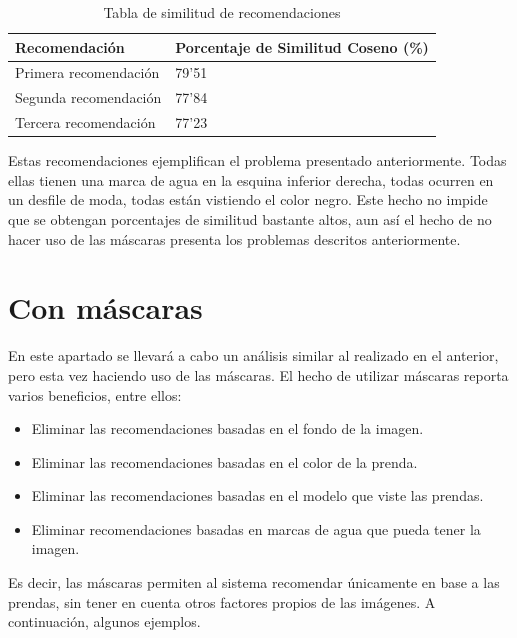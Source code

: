 \documentclass[12pt]{report} %
\begin{document}
	\begin{table}[H]
		\centering
		\caption{Tabla de similitud de recomendaciones}
		\begin{tabular}{ll}
				\textbf{Recomendación} & \textbf{Porcentaje de Similitud Coseno (\%)} \\
				\midrule
				Primera recomendación & 79'51 \\
				Segunda recomendación & 77'84 \\
				Tercera recomendación & 77'23 \\
				\bottomrule
		\end{tabular}
	\end{table}
	Estas recomendaciones ejemplifican el problema presentado anteriormente. Todas ellas tienen una marca de agua en la
	esquina inferior derecha, todas ocurren en un desfile de moda, todas están vistiendo el color negro. Este hecho no impide
	que se obtengan porcentajes de similitud bastante altos, aun así el hecho de no hacer
	uso de las máscaras presenta los problemas descritos anteriormente.

	\section{Con máscaras}

	En este apartado se llevará a cabo un análisis similar al realizado en el anterior, pero esta vez haciendo uso de las máscaras.
	El hecho de utilizar máscaras reporta varios beneficios, entre ellos:
	\begin{itemize}
		\item Eliminar las recomendaciones basadas en el fondo de la imagen.
		\item Eliminar las recomendaciones basadas en el color de la prenda.
		\item Eliminar las recomendaciones basadas en el modelo que viste las prendas.
		\item Eliminar recomendaciones basadas en marcas de agua que pueda tener la imagen.
	\end{itemize}
	Es decir, las máscaras permiten al sistema recomendar únicamente en base a las prendas, sin tener en cuenta otros factores propios de las imágenes.
	A continuación, algunos ejemplos.
\end{document}
